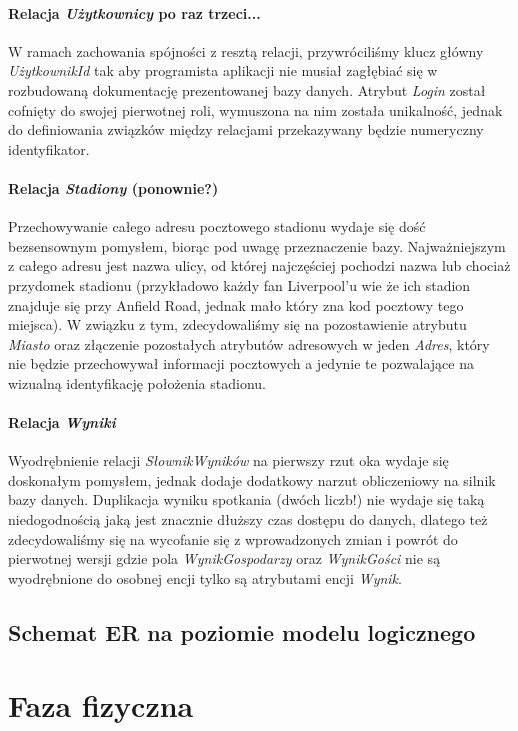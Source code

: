 \documentclass{mwrep}
\begin{document}
\subsubsection{Relacja \emph{Użytkownicy} po raz trzeci...}
W ramach zachowania spójności z resztą relacji, przywróciliśmy klucz główny \emph{UżytkownikId} tak aby programista aplikacji 
nie musiał zagłębiać się w rozbudowaną dokumentację prezentowanej bazy danych. Atrybut \emph{Login} został cofnięty do swojej pierwotnej roli,
wymuszona na nim została unikalność, jednak do definiowania związków między relacjami przekazywany będzie numeryczny identyfikator.

\subsubsection{Relacja \emph{Stadiony} (ponownie?)}
Przechowywanie całego adresu pocztowego stadionu wydaje się dość bezsensownym pomysłem, biorąc pod uwagę przeznaczenie bazy. 
Najważniejszym z całego adresu jest nazwa ulicy, od której najczęściej pochodzi nazwa lub chociaż przydomek stadionu (przykładowo każdy fan 
Liverpool'u wie że ich stadion znajduje się przy Anfield Road, jednak mało który zna kod pocztowy tego miejsca). W związku z tym, zdecydowaliśmy
się na pozostawienie atrybutu \emph{Miasto} oraz złączenie pozostałych atrybutów adresowych w jeden \emph{Adres}, który nie będzie przechowywał
informacji pocztowych a jedynie te pozwalające na wizualną identyfikację położenia stadionu.

\subsubsection{Relacja \emph{Wyniki}}
Wyodrębnienie relacji \emph{SłownikWyników} na pierwszy rzut oka wydaje się doskonałym pomysłem, jednak dodaje dodatkowy narzut obliczeniowy
na silnik bazy danych. Duplikacja wyniku spotkania (dwóch liczb!) nie wydaje się taką niedogodnością jaką jest znacznie dłuższy czas dostępu do danych, dlatego też 
zdecydowaliśmy się na wycofanie się z wprowadzonych zmian i powrót do pierwotnej wersji gdzie pola \emph{WynikGospodarzy} oraz \emph{WynikGości}
nie są wyodrębnione do osobnej encji tylko są atrybutami encji \emph{Wynik}.

\section{Schemat ER na poziomie modelu logicznego}

\chapter{Faza fizyczna}
\end{document}
